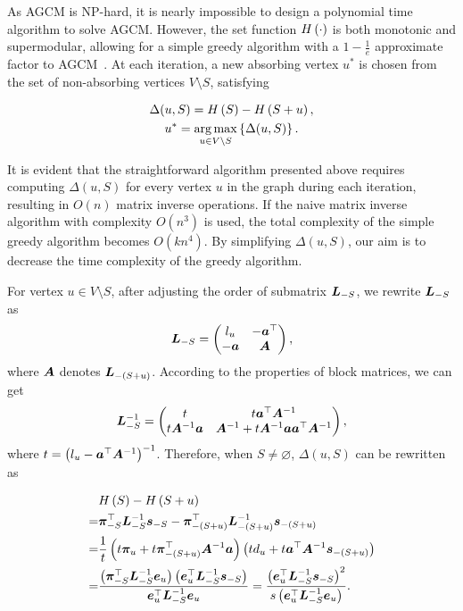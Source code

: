 \documentclass[journal]{IEEEtran}
\begin{document}
As AGCM is NP-hard, it is nearly impossible to design a polynomial time algorithm to solve AGCM.
However, the set function \(H\left(\cdot\right)\) is both monotonic and supermodular, allowing for a simple greedy algorithm with a \(1-\frac{1}{e}\) approximate factor to AGCM~\cite{NeWoFi78}.
At each iteration, a new absorbing vertex \(u^*\) is chosen from the set of non-absorbing vertices \(V\setminus S\), satisfying

\begin{gather*}
    \Delta(u,S)=H\left(S\right)-H\left(S+u\right),\\
    u^*=\operatorname*{arg\,max}_{u\in V\setminus S}\left\{\Delta(u,S) \right\}.
\end{gather*}

It is evident that the straightforward algorithm presented above requires computing \(\Delta(u,S)\) for every vertex \(u\) in the graph during each iteration, resulting in \(O(n)\) matrix inverse operations.
If the naive matrix inverse algorithm with complexity \(O(n^3)\) is used, the total complexity of the simple greedy algorithm becomes \(O(kn^4)\).
By simplifying \(\Delta(u,S)\), our aim is to decrease the time complexity of the greedy algorithm.

For vertex \(u\in V\setminus S\), after adjusting the order of submatrix \(\boldsymbol{L}_{-S}\), we rewrite \(\boldsymbol{L}_{-S}\) as
\begin{equation*}
    \boldsymbol{L}_{-S}=\begin{pmatrix}l_u & -\boldsymbol{a}^\top \\-\boldsymbol{a}&\boldsymbol{A}\end{pmatrix},
\end{equation*}
where \(\boldsymbol{A}\) denotes \(\boldsymbol{L}_{-(S+u)}\).
According to the properties of block matrices, we can get
\begin{equation*}
    \boldsymbol{L}_{-S}^{-1}=\begin{pmatrix}
        t & t\boldsymbol{a}^\top\boldsymbol{A}^{-1} \\t\boldsymbol{A}^{-1}\boldsymbol{a}&\boldsymbol{A}^{-1}+t\boldsymbol{A}^{-1}\boldsymbol{a}\boldsymbol{a}^\top\boldsymbol{A}^{-1}
    \end{pmatrix},
\end{equation*}
where \(t={\left( l_u-\boldsymbol{a}^\top{\boldsymbol{A}}^{-1} \right)}^{-1}\).
Therefore, when \(S\neq\varnothing\), \(\Delta(u,S)\) can be rewritten as

\begin{equation}\label{eq:margin-deriv}
    \begin{split}
        &H\left(S\right)-H\left(S+u\right)\\
        =&\boldsymbol{\pi}_{-S}^\top\boldsymbol{L}_{-S}^{-1}\boldsymbol{s}_{-S}-\boldsymbol{\pi}_{-(S+u)}^\top\boldsymbol{L}_{-(S+u)}^{-1}\boldsymbol{s}_{-(S+u)}\\
        =&\frac1t\left( t\boldsymbol{\pi}_u+t\boldsymbol{\pi}_{-(S+u)}^\top\boldsymbol{A}^{-1}\boldsymbol{a} \right)\left( td_u+t\boldsymbol{a}^\top\boldsymbol{A}^{-1}\boldsymbol{s}_{-(S+u)} \right)\\
        =&\frac{\left( \boldsymbol{\pi}_{-S}^\top\boldsymbol{L}_{-S}^{-1}\boldsymbol{e}_u \right)\left( \boldsymbol{e}_u^\top\boldsymbol{L}_{-S}^{-1}\boldsymbol{s}_{-S} \right)}{\boldsymbol{e}_u^\top\boldsymbol{L}_{-S}^{-1}\boldsymbol{e}_u}=\frac{\left( \boldsymbol{e}_u^\top\boldsymbol{L}_{-S}^{-1}\boldsymbol{s}_{-S} \right)^2}{s\left( \boldsymbol{e}_u^\top\boldsymbol{L}_{-S}^{-1}\boldsymbol{e}_u \right)}.
    \end{split}
\end{equation}
\end{document}
